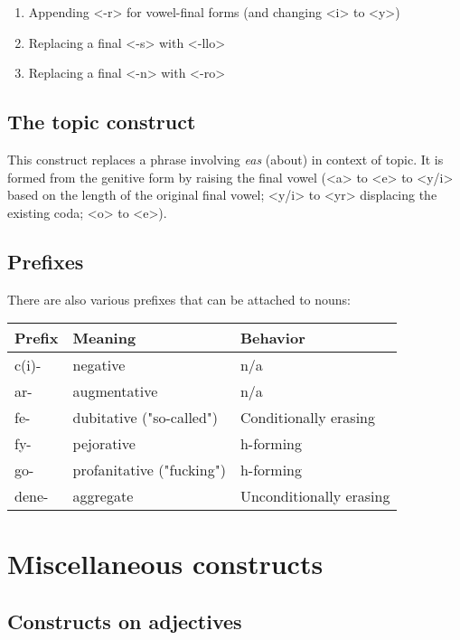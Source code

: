 \documentclass{book}
\begin{document}
\begin{enumerate}
	\item Appending <-r> for vowel-final forms (and changing <i> to <y>)
	\item Replacing a final <-s> with <-llo>
	\item Replacing a final <-n> with <-ro>
\end{enumerate}

\section{The topic construct}

This construct replaces a phrase involving \emph{eas} (about) in context of topic. It is formed from the genitive form by raising the final vowel (<a> to <e> to <y/i> based on the length of the original final vowel; <y/i> to <yr> displacing the existing coda; <o> to <e>).

\section{Prefixes}

There are also various prefixes that can be attached to nouns: \\

\begin{center}
	\begin{tabular}{|l|l|l|}
		\hline
		Prefix & Meaning & Behavior \\ \hline
		c(i)- & negative & n/a \\
		ar- & augmentative & n/a \\
		fe- & dubitative ("so-called") & Conditionally erasing \\
		fy- & pejorative & h-forming \\
		go- & profanitative ("fucking") & h-forming \\
		dene- & aggregate & Unconditionally erasing \\
		\hline
	\end{tabular}
\end{center}

\chapter{Miscellaneous constructs}

\section{Constructs on adjectives}
\end{document}
